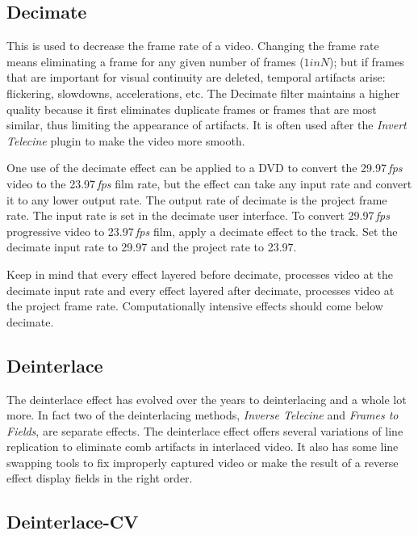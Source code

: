 \subsection{Decimate}%
\label{sub:decimate}

This is used to decrease the frame rate of a video. Changing the frame rate means eliminating a frame for any given number of frames ($1 in N$); but if frames that are important for visual continuity are deleted, temporal artifacts arise: flickering, slowdowns, accelerations, etc. The Decimate filter maintains a higher quality because it first eliminates duplicate frames or frames that are most similar, thus limiting the appearance of artifacts. It is often used after the \textit{Invert Telecine} plugin to make the video more smooth.

One use of the decimate effect can be applied to a DVD to convert the 29.97\,\emph{fps} video to the 23.97\,\emph{fps} film rate, but the effect can take any input rate and convert it to any lower output rate. The output rate of decimate is the project frame rate. The input rate is set in the decimate user interface. To convert 29.97\,\emph{fps} progressive video to 23.97\,\emph{fps} film, apply a decimate effect to the track. Set the decimate input rate to 29.97 and the project rate to 23.97.

Keep in mind that every effect layered before decimate, processes video at the decimate input rate and every effect layered after decimate, processes video at the project frame rate. Computationally intensive effects should come below decimate.

\subsection{Deinterlace}%
\label{sub:deinterlace}

The deinterlace effect has evolved over the years to deinterlacing and a whole lot more. In fact two of the deinterlacing methods, \textit{Inverse Telecine} and \textit{Frames to Fields}, are separate effects. The deinterlace effect offers several variations of line replication to eliminate comb artifacts in interlaced video. It also has some line swapping tools to fix improperly captured video or make the result of a reverse effect display fields in the right order.

\subsection{Deinterlace-CV}%
\label{sub:deinterlace_cv}

